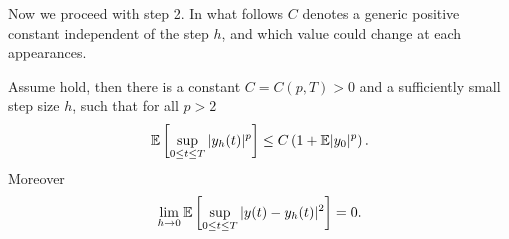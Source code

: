 	Now we proceed with step 2. In what follows $C$ denotes a generic positive constant independent of the step $h$, and
which value could change at each appearances.
\begin{lem}\label{lem:BoundAndConvergenceOfyh}
	Assume  hold, then there is a constant $C=C(p,T)>0$ and a sufficiently small
	step size $h$, such that for all $p>2$
	\begin{equation}\label{eqn:yh-MomentBounds}
		\mathbb{E}\left[
			\sup_{0\leq t \leq T}
				|y_h(t)|^p
		\right]
		\leq
			C
		\left( 
			1+\mathbb{E}|y_0|^p
		\right).
	\end{equation}
	Moreover
	\begin{equation}\label{eqn:yh-convergence}
	\lim_{h \to 0}
	\mathbb{E}\left[
	\sup_{0\leq t \leq T}
	|y(t)-y_h(t)|^2
	\right]=0.
	\end{equation}
\end{lem}

